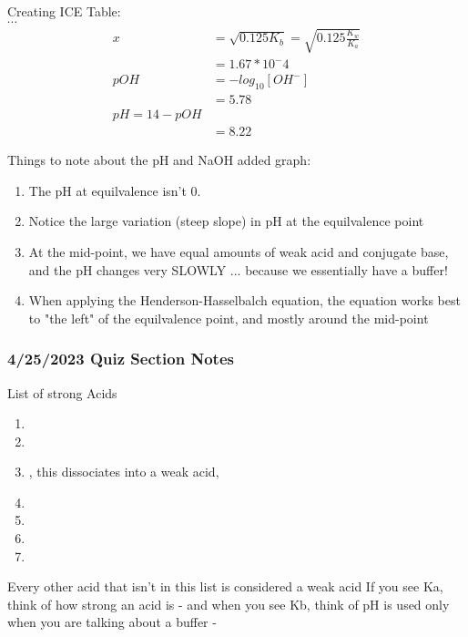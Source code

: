 \documentclass{article}  %
\begin{document}
Creating ICE Table: \\

$\cdots$ %
\begin{equation*}
    \begin{aligned}
        x &= \sqrt{0.125 K_b} = \sqrt{0.125 \frac{K_w}{K_a}} \\
        &= 1.67*10^-4 \\
        pOH &= -log_{10}[OH^-] \\
        &= 5.78 \\
        pH = 14 - pOH \\
        &= 8.22 
    \end{aligned}
\end{equation*}

Things to note about the pH and NaOH added graph:
\begin{enumerate}
    \item The pH at equilvalence isn't 0.
    \item Notice the large variation (steep slope) in pH at the equilvalence point
    \item At the mid-point, we have equal amounts of weak acid and conjugate base, and the pH changes very SLOWLY ... because we essentially have a buffer!
    \item When applying the Henderson-Hasselbalch equation, the equation works best to "the left" of the equilvalence point, and mostly around the mid-point
\end{enumerate}

\subsubsection*{4/25/2023 Quiz Section Notes}

List of strong Acids
\begin{enumerate}
    \item {}
    \item {}
    \item {}, this dissociates into a weak acid, 
    \item {}
    \item {}
    \item {}
    \item {}
\end{enumerate}
Every other acid that isn't in this list is considered a weak acid
\newline
If you see Ka, think of how strong an acid is - and when you see Kb, think of 
\newline
pH is used only when you are talking about a buffer - 
\end{document}
